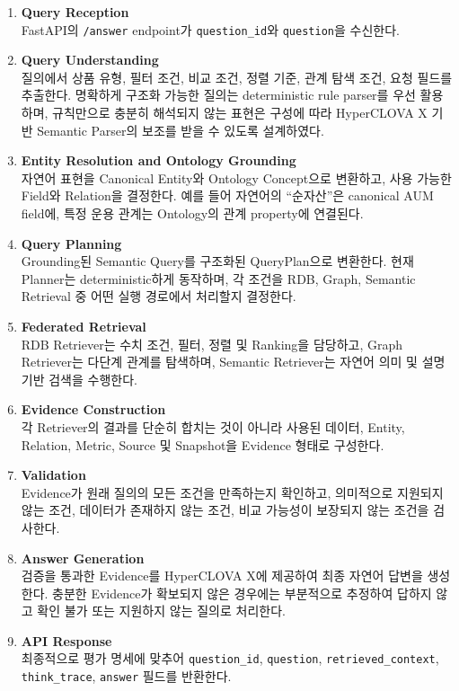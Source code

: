 \documentclass[11pt,a4paper]{article}
\begin{document}
\begin{enumerate}
    \item \textbf{Query Reception}\\
    FastAPI의 \texttt{/answer} endpoint가
    \texttt{question\_id}와 \texttt{question}을 수신한다.

    \item \textbf{Query Understanding}\\
    질의에서 상품 유형, 필터 조건, 비교 조건,
    정렬 기준, 관계 탐색 조건, 요청 필드를 추출한다.
    명확하게 구조화 가능한 질의는 deterministic rule parser를 우선 활용하며,
    규칙만으로 충분히 해석되지 않는 표현은
    구성에 따라 HyperCLOVA X 기반 Semantic Parser의 보조를 받을 수 있도록 설계하였다.

    \item \textbf{Entity Resolution and Ontology Grounding}\\
    자연어 표현을 Canonical Entity와 Ontology Concept으로 변환하고,
    사용 가능한 Field와 Relation을 결정한다.
    예를 들어 자연어의 ``순자산''은 canonical AUM field에,
    특정 운용 관계는 Ontology의 관계 property에 연결된다.

    \item \textbf{Query Planning}\\
    Grounding된 Semantic Query를 구조화된 QueryPlan으로 변환한다.
    현재 Planner는 deterministic하게 동작하며,
    각 조건을 RDB, Graph, Semantic Retrieval 중
    어떤 실행 경로에서 처리할지 결정한다.

    \item \textbf{Federated Retrieval}\\
    RDB Retriever는 수치 조건, 필터, 정렬 및 Ranking을 담당하고,
    Graph Retriever는 다단계 관계를 탐색하며,
    Semantic Retriever는 자연어 의미 및 설명 기반 검색을 수행한다.

    \item \textbf{Evidence Construction}\\
    각 Retriever의 결과를 단순히 합치는 것이 아니라
    사용된 데이터, Entity, Relation, Metric,
    Source 및 Snapshot을 Evidence 형태로 구성한다.

    \item \textbf{Validation}\\
    Evidence가 원래 질의의 모든 조건을 만족하는지 확인하고,
    의미적으로 지원되지 않는 조건,
    데이터가 존재하지 않는 조건,
    비교 가능성이 보장되지 않는 조건을 검사한다.

    \item \textbf{Answer Generation}\\
    검증을 통과한 Evidence를 HyperCLOVA X에 제공하여
    최종 자연어 답변을 생성한다.
    충분한 Evidence가 확보되지 않은 경우에는
    부분적으로 추정하여 답하지 않고
    확인 불가 또는 지원하지 않는 질의로 처리한다.

    \item \textbf{API Response}\\
    최종적으로 평가 명세에 맞추어
    \texttt{question\_id},
    \texttt{question},
    \texttt{retrieved\_context},
    \texttt{think\_trace},
    \texttt{answer}
    필드를 반환한다.
\end{enumerate}
\end{document}
